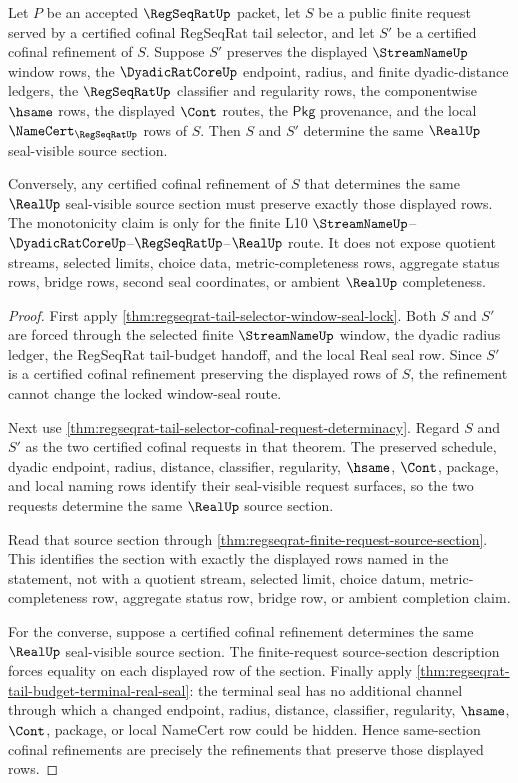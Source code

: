 \begin{theorem}
\label{thm:regseqrat-tail-selector-cofinal-refinement-monotonicity}
Let $P$ be an accepted $\RegSeqRatUp$ packet, let $S$ be a public finite
request served by a certified cofinal RegSeqRat tail selector, and let $S'$ be
a certified cofinal refinement of $S$. Suppose $S'$ preserves the displayed
$\StreamNameUp$ window rows, the $\DyadicRatCoreUp$ endpoint, radius, and
finite dyadic-distance ledgers, the $\RegSeqRatUp$ classifier and regularity
rows, the componentwise $\hsame$ rows, the displayed $\Cont$ routes, the
$\mathsf{Pkg}$ provenance, and the local $\NameCert_{\RegSeqRatUp}$ rows of
$S$. Then $S$ and $S'$ determine the same $\RealUp$ seal-visible source
section.

Conversely, any certified cofinal refinement of $S$ that determines the same
$\RealUp$ seal-visible source section must preserve exactly those displayed
rows. The monotonicity claim is only for the finite L10
$\StreamNameUp$--$\DyadicRatCoreUp$--$\RegSeqRatUp$--$\RealUp$ route. It does
not expose quotient streams, selected limits, choice data, metric-completeness
rows, aggregate status rows, bridge rows, second seal coordinates, or ambient
$\RealUp$ completeness.
\end{theorem}
\begin{proof}
First apply
\autoref{thm:regseqrat-tail-selector-window-seal-lock}. Both $S$ and $S'$ are
forced through the selected finite $\StreamNameUp$ window, the dyadic radius
ledger, the RegSeqRat tail-budget handoff, and the local Real seal row. Since
$S'$ is a certified cofinal refinement preserving the displayed rows of $S$,
the refinement cannot change the locked window-seal route.

Next use
\autoref{thm:regseqrat-tail-selector-cofinal-request-determinacy}. Regard $S$
and $S'$ as the two certified cofinal requests in that theorem. The preserved
schedule, dyadic endpoint, radius, distance, classifier, regularity, $\hsame$,
$\Cont$, package, and local naming rows identify their seal-visible request
surfaces, so the two requests determine the same $\RealUp$ source section.

Read that source section through
\autoref{thm:regseqrat-finite-request-source-section}. This identifies the
section with exactly the displayed rows named in the statement, not with a
quotient stream, selected limit, choice datum, metric-completeness row,
aggregate status row, bridge row, or ambient completion claim.

For the converse, suppose a certified cofinal refinement determines the same
$\RealUp$ seal-visible source section. The finite-request source-section
description forces equality on each displayed row of the section. Finally
apply \autoref{thm:regseqrat-tail-budget-terminal-real-seal}: the terminal seal
has no additional channel through which a changed endpoint, radius, distance,
classifier, regularity, $\hsame$, $\Cont$, package, or local NameCert row could
be hidden. Hence same-section cofinal refinements are precisely the refinements
that preserve those displayed rows.
\end{proof}

